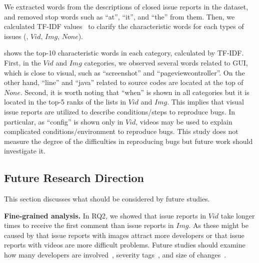 We extracted words from the descriptions of closed issue reports in the dataset, and  removed stop words such as ``at'', ``it'', and ``the'' from them. 
Then, we calculated TF-IDF values~\citep{salton1988-tfidf} to clarify the characteristic words for each types of issues (\ie, $Vid$, $Img$, $None$). 

 shows the top-10 characteristic words in each category, calculated by TF-IDF.
First, in the $Vid$ and $Img$ categories, we observed several words related to GUI, which is close to visual, such as ``screenshot'' and ``pageviewcontroller''. 
On the other hand, ``line'' and ``java'' related to source codes are located at the top of $None$.
Second, it is worth noting that ``when'' is shown in all categories but it is located in the top-5 ranks of the lists in $Vid$ and $Img$.
This implies that visual issue reports are utilized to describe conditions/steps to reproduce bugs. In particular, as ``config'' is shown only in $Vid$, videos may be used to explain complicated conditions/environment to reproduce bugs. This study does not measure the degree of the difficulties in reproducing bugs but future work should investigate it.

\vspace{-0.95mm}

\vspace{-0.95mm}

\subsection{Future Research Direction}
This section discusses what should be considered by future studies. 

\noindent
\textbf{Fine-grained analysis. }
In RQ2, we showed that issue reports in $Vid$ take longer times to receive the first comment than issue reports in $Img$. 
As these might be caused by that issue reports with images attract more developers or that issue reports with videos are more difficult problems.
Future studies should examine how many developers are involved~\citep{DBLP:conf/icsm/BavotaR15}, severity tags~\citep{DBLP:conf/issre/ZhouNG15}, and size of changes~\citep{DBLP:conf/kbse/HattoriL08}.

